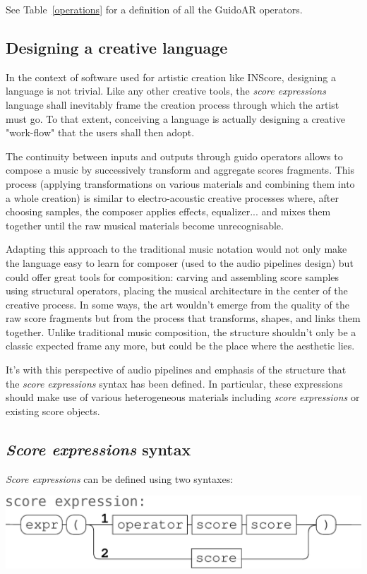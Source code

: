 \documentclass{article}
\newcommand{\sExpr}{\emph{score expressions} }
\newcommand{\SExpr}{\emph{Score expressions} }
\begin{document}
See Table~\ref{operations} for a definition of all the GuidoAR operators.

\subsection{Designing a creative language}
In the context of software used for artistic creation like INScore, designing a language is not trivial. Like any other creative tools,  the \sExpr language shall inevitably frame the creation process through which the artist must go. To that extent, conceiving a language is actually designing a creative "work-flow" that the users shall then adopt.

The continuity between inputs and outputs through guido operators allows to compose a music by successively transform and aggregate scores fragments. This process (applying transformations on various materials and combining them into a whole creation) is similar to electro-acoustic creative processes where, after choosing samples, the composer applies effects, equalizer... and mixes them together until the raw musical materials become unrecognisable.

Adapting this approach to the traditional music notation would not only make the language easy to learn for composer (used to the audio pipelines design) but could offer great tools for composition: carving and assembling score samples using structural operators, placing the musical architecture in the center of the creative process. In some ways, the art wouldn't emerge from the quality of the raw score fragments but from the process that transforms, shapes, and links them together. Unlike traditional music composition, the structure shouldn't only be a classic expected frame any more, but could be the place where the aesthetic lies.

It's with this perspective of audio pipelines and emphasis of the structure that the \sExpr syntax has been defined. In particular, these expressions should make use of various heterogeneous materials including \sExpr or existing score objects.

\subsection{\SExpr syntax}

\smallbreak
\SExpr can be defined using two syntaxes:
\begin{center}
\includegraphics[width=0.9\columnwidth]{imgs/syntax1}
\end{center}
\end{document}
